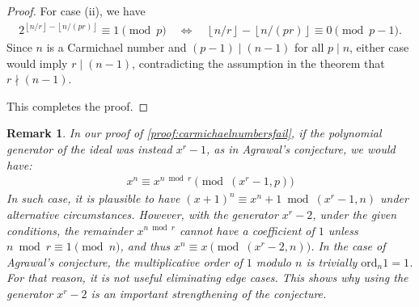 \documentclass{article}
\theoremstyle{plain}
\newtheorem{remark}{Remark}
\theoremstyle{definition}
\newcommand{\floor}[1]{\left\lfloor #1 \right\rfloor}
\newcommand{\ord}{\mathrm{ord}}
\begin{document}
\begin{proof}
For case (ii), we have
\begin{align*}
    2^{\floor{n/r} - \floor{n/(pr)}} \equiv 1 \pmod{p} 
    \quad \Longleftrightarrow \quad
    \floor{n/r} - \floor{n/(pr)} \equiv 0 \pmod{p-1} .
\end{align*}
Since $n$ is a Carmichael number and $(p-1) \mid (n-1)$ for all $p \mid n$, either case would imply $r \mid (n-1)$, contradicting the assumption in the theorem that $r \nmid (n-1)$.

This completes the proof.
\end{proof}

\begin{remark}
In our proof of \cref{proof:carmichaelnumbersfail}, if the polynomial generator of the ideal was instead $x^r-1$, as in Agrawal's conjecture, we would have:
\begin{align*}
    x^n \equiv x^{n \bmod r} \pmod{(x^r-1, p)}
\end{align*}
In such case, it is plausible to have $(x+1)^n \equiv x^n + 1 \bmod{(x^r-1, n)}$ under alternative circumstances. However, with the generator $x^r-2$, under the given conditions, the remainder $x^{n \bmod r}$ cannot have a coefficient of $1$ unless $n \bmod r \equiv 1 \pmod{n}$, and thus $x^n \equiv x \pmod{(x^r-2,n)}$. In the case of Agrawal's conjecture, the multiplicative order of $1$ modulo $n$ is trivially $\ord_n 1 = 1$. For that reason, it is not useful eliminating edge cases. This shows why using the generator $x^r-2$ is an important strengthening of the conjecture.
\end{remark}
\end{document}
